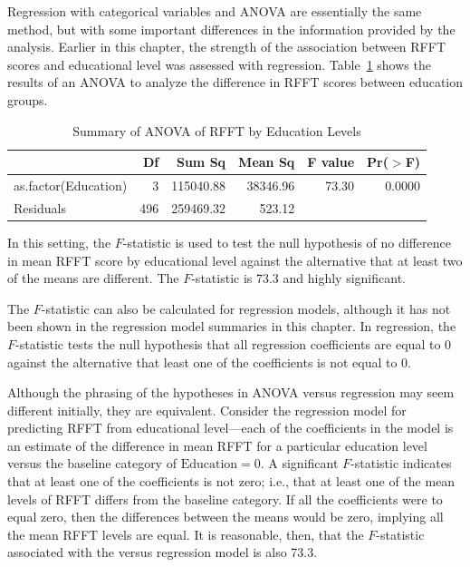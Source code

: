Regression with categorical variables and ANOVA are essentially the same method, but with some important differences in the information provided by the analysis. Earlier in this chapter, the strength of the association between RFFT scores and educational level was assessed with regression. Table~\ref{prevendANOVARFFTEduc} shows the results of an ANOVA to analyze the difference in RFFT scores between education groups.

\begin{table}[ht]
\centering
\begin{tabular}{lrrrrr}
  \hline
 & Df & Sum Sq & Mean Sq & F value & Pr($>$F) \\ 
  \hline
as.factor(Education) & 3 & 115040.88 & 38346.96 & 73.30 & 0.0000 \\ 
  Residuals            & 496 & 259469.32 & 523.12 &  &  \\ 
   \hline
\end{tabular}
\caption{Summary of ANOVA of RFFT by Education Levels} 
\label{prevendANOVARFFTEduc}
\end{table}

In this setting, the $F$-statistic is used to test the null hypothesis of no difference in mean RFFT score by educational level against the alternative that at least two of the means are different. The $F$-statistic is 73.3 and highly significant. 

The $F$-statistic can also be calculated for regression models, although it has not been shown in the regression model summaries in this chapter. In regression, the $F$-statistic tests the null hypothesis that all regression coefficients are equal to 0 against the alternative that least one of the coefficients is not equal to 0. 

Although the phrasing of the hypotheses in ANOVA versus regression may seem different initially, they are equivalent. Consider the regression model for predicting RFFT from educational level---each of the coefficients in the model is an estimate of the difference in mean RFFT for a particular education level versus the baseline category of $\text{Education} = 0$. A significant $F$-statistic indicates that at least one of the coefficients is not zero; i.e., that at least one of the mean levels of RFFT differs from the baseline category. If all the coefficients were to equal zero, then the differences between the means would be zero, implying all the mean RFFT levels are equal. It is reasonable, then, that the $F$-statistic associated with the  versus  regression model is also 73.3. 

